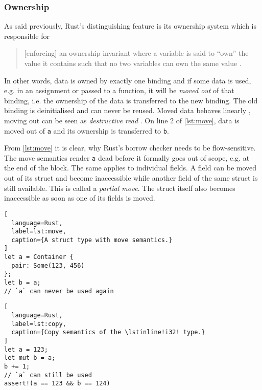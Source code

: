 \subsubsection{Ownership}

As said previously, Rust's distinguishing feature is its ownership system which
is responsible for

\begin{quote}
{[enforcing]} an ownership invariant where a
variable is said to ``own'' the value it contains such that no two variables can
own the same value \cite[page 5]{lightweight-formalism}.
\end{quote}

In other words, data is owned by exactly one binding and if some data is used,
e.g. in an assignment or passed to a function, it will be \emph{moved out} of
that binding, i.e. the ownership of the data is transferred to the new binding.
The old binding is deinitialised and can never be reused. Moved data behaves
linearly \cite{oxide}, moving out can be seen as \emph{destructive read}
\cite{islands-alias-protection}. On line 2 of \autoref{lst:move}, data is moved
out of \lstinline!a! and its ownership is transferred to \lstinline!b!.

From \autoref{lst:move} it is clear, why Rust's borrow checker needs to be
flow-sensitive. The move semantics render \lstinline!a! dead before it formally
goes out of scope, e.g. at the end of the block. The same applies to individual
fields. A field can be moved out of its struct and become inaccessible while
another field of the same struct is still available. This is called a
\emph{partial move}. The struct itself also becomes inaccessible as soon as one
of its fields is moved.

\noindent\begin{minipage}[t]{.47\textwidth}
\begin{lstlisting}[
  language=Rust,
  label=lst:move,
  caption={A struct type with move semantics.}
]
let a = Container {
  pair: Some(123, 456)
};
let b = a;
// `a` can never be used again
\end{lstlisting}
\end{minipage}\hfill
\begin{minipage}[t]{.47\textwidth}
\begin{lstlisting}[
  language=Rust,
  label=lst:copy,
  caption={Copy semantics of the \lstinline!i32! type.}
]
let a = 123;
let mut b = a;
b += 1;
// `a` can still be used
assert!(a == 123 && b == 124)
\end{lstlisting}
\end{minipage}

